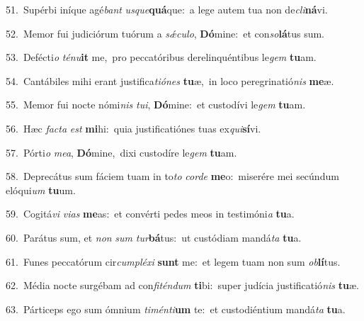 {\numbfont\textcolor{\numbcolor}{51.}}~Supérbi iníque agé\textit{bant} \textit{us}\-\textit{que}\textbf{quá}que:~\star a lege autem tua non de\-\textit{cli}\-\textbf{ná}vi.\par
{\numbfont\textcolor{\numbcolor}{52.}}~Memor fui judiciórum tuórum a \textit{sǽ}\-\textit{cu}\textit{lo}, \textbf{Dó}\-mine:~\star et con\-\textit{so}\-\textbf{lá}tus sum.\par
{\numbfont\textcolor{\numbcolor}{53.}}~Defécti\textit{o} \textit{té}\-\textit{nu}\textbf{it} me,~\star pro peccatóribus derelinquéntibus le\textit{gem} \textbf{tu}\-am.\par
{\numbfont\textcolor{\numbcolor}{54.}}~Cantábiles mihi erant justifica\-\textit{ti}\-\textit{ó}\textit{nes} \textbf{tu}\-æ,~\star in loco peregrinatió\textit{nis} \textbf{me}\-æ.\par
{\numbfont\textcolor{\numbcolor}{55.}}~Memor fui nocte nómi\textit{nis} \textit{tu}\-\textit{i}, \textbf{Dó}\-mine:~\star et custodívi le\textit{gem} \textbf{tu}\-am.\par
{\numbfont\textcolor{\numbcolor}{56.}}~Hæc \textit{fac}\-\textit{ta} \textit{est} \textbf{mi}\-hi:~\star quia justificatiónes tuas ex\-\textit{qui}\-\textbf{sí}vi.\par
{\numbfont\textcolor{\numbcolor}{57.}}~Pórti\textit{o} \textit{me}\-\textit{a}, \textbf{Dó}\-mine,~\star dixi custodíre le\textit{gem} \textbf{tu}\-am.\par
{\numbfont\textcolor{\numbcolor}{58.}}~Deprecátus sum fáciem tuam in to\textit{to} \textit{cor}\-\textit{de} \textbf{me}\-o:~\star miserére mei secúndum elóqui\textit{um} \textbf{tu}\-um.\par
{\numbfont\textcolor{\numbcolor}{59.}}~Cogitá\textit{vi} \textit{vi}\-\textit{as} \textbf{me}\-as:~\star et convérti pedes meos in testimóni\textit{a} \textbf{tu}\-a.\par
{\numbfont\textcolor{\numbcolor}{60.}}~Parátus sum, et \textit{non} \textit{sum} \textit{tur}\-\textbf{bá}tus:~\star ut custódiam mandá\textit{ta} \textbf{tu}\-a.\par
{\numbfont\textcolor{\numbcolor}{61.}}~Funes peccatórum cir\-\textit{cum}\-\textit{plé}\textit{xi} \textbf{sunt} me:~\star et legem tuam non sum \textit{ob}\-\textbf{lí}tus.\par
{\numbfont\textcolor{\numbcolor}{62.}}~Média nocte surgébam ad con\-\textit{fi}\-\textit{tén}\textit{dum} \textbf{ti}\-bi:~\star super judícia justificatió\textit{nis} \textbf{tu}\-æ.\par
{\numbfont\textcolor{\numbcolor}{63.}}~Párticeps ego sum ómnium \textit{ti}\-\textit{mén}\textit{ti}\textbf{um} te:~\star et custodiéntium mandá\textit{ta} \textbf{tu}\-a.\par
